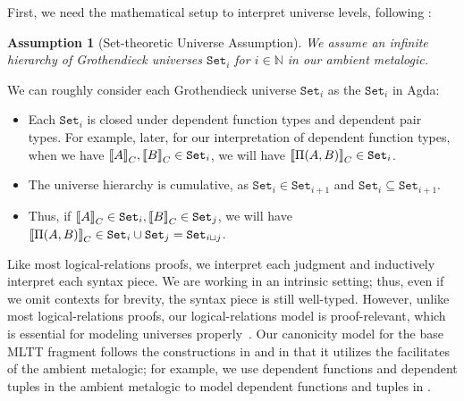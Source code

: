 First, we need the mathematical setup to interpret universe levels, following \citet{sterling2019algebraic}:

\newcommand{\Set}[1]{\ensuremath{\texttt{Set}_{#1}}}
\newtheorem{assumption}{Assumption}[section]

\begin{assumption}[Set-theoretic Universe Assumption] We assume an infinite hierarchy of Grothendieck universes $\Set{i}$ for $i \in \mathbb{N}$ in our ambient meta\-logic.
\end{assumption}

We can roughly consider each Grothendieck universe $\Set{i}$ as the $\Set{i}$ in Agda: 
\begin{itemize}
  \item Each $\Set{i}$ is closed under dependent function types and dependent
  pair types. For example, later, for our interpretation of dependent function
  types, when we have $\denotesC{A}, \denotesC{B} \in \Set{i}$, we will have
  $\denotesC{\TyPi{A}{B}} \in \Set{i}$.
  \item The universe hierarchy is cumulative, as $\Set{i} \in \Set{i+1}$ and $\Set{i} \subseteq \Set{i+1}$.
  \item Thus, if $\denotesC{A} \in \Set{i}, \denotesC{B} \in \Set{j}$, we will
  have $\denotesC{\TyPi{A}{B}} \in \Set{i} \cup \Set{j} = \Set{i \lcup j}$.
\end{itemize}


Like most logical-relations proofs, we interpret each judgment and inductively
interpret each syntax piece. We are working in an intrinsic setting; thus, even if
we omit contexts for brevity, the syntax piece is still well-typed. However,
unlike most logical-relations proofs, our logical-relations model is proof-relevant,
which is essential for modeling universes
properly~\cite{coquand2018canonicity}.
Our canonicity model for the base MLTT fragment follows the constructions
in \citet{coquand2018canonicity} and \citet{sterling2019algebraic} in that it
utilizes the facilitates of the ambient meta\-logic; for example, we use dependent functions and
dependent tuples in the ambient meta\-logic to model dependent functions and tuples in \TT.

